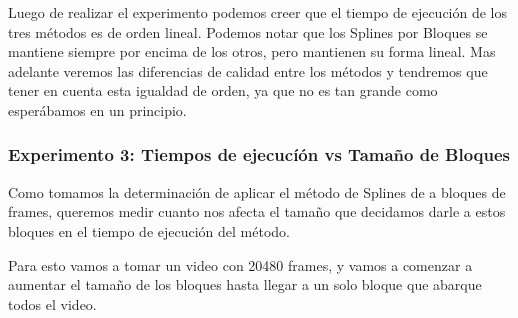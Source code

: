 \begin{figure}[ht]
	\begin{center}
	\end{center}
\end{figure}
\par Luego de realizar el experimento podemos creer que el tiempo de ejecuci\'on de los tres m\'etodos es de orden lineal. Podemos notar que los Splines por Bloques se mantiene siempre por encima de los otros, pero mantienen su forma lineal. Mas adelante veremos las diferencias de calidad entre los m\'etodos y tendremos que tener en cuenta esta igualdad de orden, ya que no es tan grande como esper\'abamos en un principio. 





\subsubsection{Experimento 3: Tiempos de ejecucí\'on vs Tama\~no de Bloques}
\par Como tomamos la determinación de aplicar el m\'etodo de Splines de a bloques de frames, queremos medir cuanto nos afecta el tama\~no que decidamos darle a estos bloques en el tiempo de ejecuci\'on del m\'etodo.

\par Para esto vamos a tomar un video con 20480 frames, y vamos a comenzar a aumentar el tama\~no de los bloques hasta llegar a un solo bloque que abarque todos el video.


